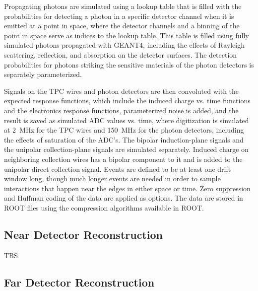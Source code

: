 Propagating photons are simulated using a lookup table that is filled
with the probabilities for detecting a photon in a specific detector channel
when it is emitted at a point in space, where the detector channels
and a binning of the point in space serve as indices to the lookup table.
This table is filled using fully simulated photons propagated with GEANT4, including the effects
of Rayleigh scattering, reflection, and absorption on the detector
surfaces.  The detection probabilities for photons striking the
sensitive materials of the photon detectors is separately
parameterized.

Signals on the TPC wires and photon detectors are then convoluted with
the expected response functions, which include the induced charge
vs. time functions and the electronics response functions,
parameterized noise is added, and the result is saved as simulated ADC
values vs. time, where digitization is simulated at 2~MHz for the TPC
wires and 150~MHz for the photon detectors, including the effects of
saturation of the ADC's.  The bipolar induction-plane signals and the
unipolar collection-plane signals are simulated separately.  Induced
charge on neighboring collection wires has a bipolar component to it
and is added to the unipolar direct collection signal.  Events are
defined to be at least one drift window long, though much longer
events are needed in order to sample interactions that happen near the
edges in either space or time.  Zero suppression and Huffman coding of
the data are applied as options.  The data are stored in ROOT files
using the compression algorithms available in ROOT.



\subsection{Near Detector Reconstruction}
\label{sec:detectors-sc-physics-software-reconstruction-nd}

TBS

\subsection{Far Detector Reconstruction}
\label{sec:detectors-sc-physics-software-reconstruction-fd}

